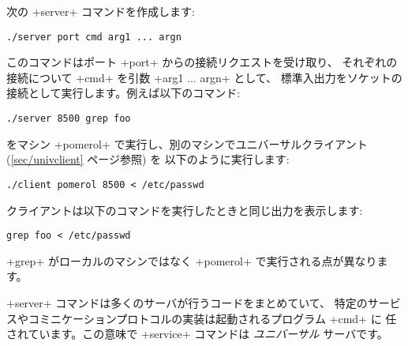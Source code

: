 次の \ml+server+ コマンドを作成します:
%
\begin{lstlisting}
./server port cmd arg1 ... argn
\end{lstlisting}
%
このコマンドはポート \ml+port+ からの接続リクエストを受け取り、
それぞれの接続について \ml+cmd+ を引数 \ml+arg1 ... argn+ として、
標準入出力をソケットの接続として実行します。例えば以下のコマンド:
%
\begin{lstlisting}
./server 8500 grep foo
\end{lstlisting}
%
をマシン \ml+pomerol+ で実行し、別のマシンでユニバーサルクライアント (\ref{sec/univclient} ページ参照) を
以下のように実行します:
%
\begin{lstlisting}
./client pomerol 8500 < /etc/passwd
\end{lstlisting}
%
クライアントは以下のコマンドを実行したときと同じ出力を表示します:
%
\begin{lstlisting}
grep foo < /etc/passwd
\end{lstlisting}
%
\ml+grep+ がローカルのマシンではなく \ml+pomerol+ で実行される点が異なります。

\ml+server+ コマンドは多くのサーバが行うコードをまとめていて、
特定のサービスやコミニケーションプロトコルの実装は起動されるプログラム \ml+cmd+ に
任されています。この意味で \ml+service+ コマンドは \emph{ユニバーサル} サーバです。

